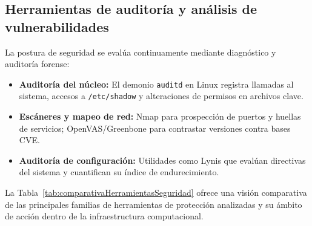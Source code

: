 \documentclass[12pt]{article}
\begin{document}
\subsection{Herramientas de auditoría y análisis de vulnerabilidades}\label{subsec:auditoriaAnalisisVulnerabilidades}

La postura de seguridad se evalúa continuamente mediante diagnóstico y auditoría forense:
\begin{itemize}[noitemsep, topsep=2pt]
    \item \textbf{Auditoría del núcleo:} El demonio \texttt{auditd} en Linux registra llamadas al sistema, accesos a \texttt{/etc/shadow} y alteraciones de permisos en archivos clave.
    \item \textbf{Escáneres y mapeo de red:} Nmap para prospección de puertos y huellas de servicios; OpenVAS/Greenbone para contrastar versiones contra bases CVE.
    \item \textbf{Auditoría de configuración:} Utilidades como Lynis que evalúan directivas del sistema y cuantifican su índice de endurecimiento.
\end{itemize}

La Tabla~\ref{tab:comparativaHerramientasSeguridad} ofrece una visión comparativa de las principales familias de herramientas de protección analizadas y su ámbito de acción dentro de la infraestructura computacional.
\end{document}
